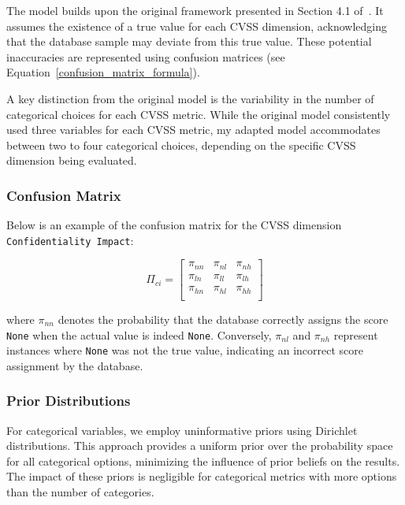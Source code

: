 \documentclass[12pt]{article}
\begin{document}
The model builds upon the original framework presented in Section 4.1 of~\cite{bayes}. It assumes
the existence of a true value for each CVSS dimension, acknowledging that the database sample may
deviate from this true value. These potential inaccuracies are represented using confusion matrices
(see Equation~\ref{confusion_matrix_formula}).

A key distinction from the original model is the variability in the number of categorical choices
for each CVSS metric. While the original model consistently used three variables for each CVSS
metric, my adapted model accommodates between two to four categorical choices, depending on the
specific CVSS dimension being evaluated.

\subsubsection{Confusion Matrix}

Below is an example of the confusion matrix for the CVSS dimension \texttt{Confidentiality Impact}:

\begin{equation}\label{confusion_matrix_formula}
	\Pi_{ci} = \begin{bmatrix}
		\pi_{nn} & \pi_{nl} & \pi_{nh} \\
		\pi_{ln} & \pi_{ll} & \pi_{lh} \\
		\pi_{hn} & \pi_{hl} & \pi_{hh} \\
	\end{bmatrix}
\end{equation}

where $\pi_{nn}$ denotes the probability that the database correctly assigns the score \texttt{None}
when the actual value is indeed \texttt{None}. Conversely, $\pi_{nl}$ and $\pi_{nh}$ represent
instances where \texttt{None} was not the true value, indicating an incorrect score assignment by
the database.

\subsubsection{Prior Distributions}

For categorical variables, we employ uninformative priors using Dirichlet distributions\cite{dirichlet}. This
approach provides a uniform prior over the probability space for all categorical options, minimizing
the influence of prior beliefs on the results. The impact of these priors is negligible for
categorical metrics with more options than the number of categories.
\end{document}
